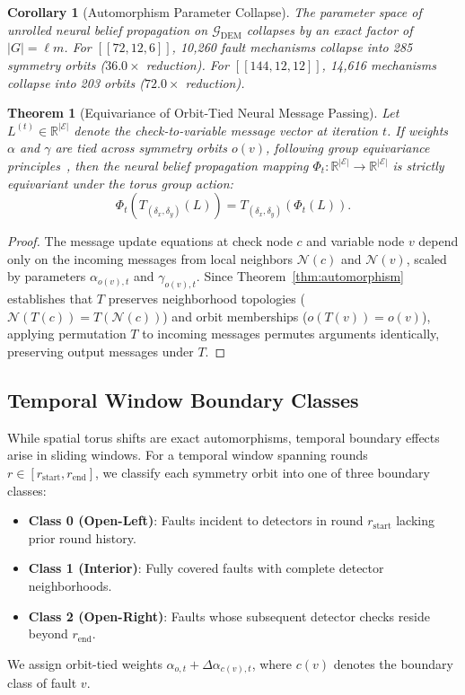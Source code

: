 \documentclass[journal]{IEEEtran}
\newtheorem{theorem}{Theorem}
\newtheorem{corollary}{Corollary}
\begin{document}
\begin{corollary}[Automorphism Parameter Collapse]
The parameter space of unrolled neural belief propagation on $\mathcal{G}_{\text{DEM}}$ collapses by an exact factor of $|G| = \ell m$. For $[[72,12,6]]$, 10,260 fault mechanisms collapse into 285 symmetry orbits ($36.0\times$ reduction). For $[[144,12,12]]$, 14,616 mechanisms collapse into 203 orbits ($72.0\times$ reduction).
\end{corollary}

\begin{theorem}[Equivariance of Orbit-Tied Neural Message Passing]
Let $L^{(t)} \in \mathbb{R}^{|\mathcal{E}|}$ denote the check-to-variable message vector at iteration $t$. If weights $\alpha$ and $\gamma$ are tied across symmetry orbits $o(v)$, following group equivariance principles~\cite{wang2022approximately}, then the neural belief propagation mapping $\Phi_t: \mathbb{R}^{|\mathcal{E}|} \to \mathbb{R}^{|\mathcal{E}|}$ is strictly equivariant under the torus group action:
\begin{equation}
    \Phi_t(T_{(\delta_x, \delta_y)}(L)) = T_{(\delta_x, \delta_y)}(\Phi_t(L)).
\end{equation}
\end{theorem}

\begin{proof}
The message update equations at check node $c$ and variable node $v$ depend only on the incoming messages from local neighbors $\mathcal{N}(c)$ and $\mathcal{N}(v)$, scaled by parameters $\alpha_{o(v), t}$ and $\gamma_{o(v), t}$. Since Theorem~\ref{thm:automorphism} establishes that $T$ preserves neighborhood topologies ($\mathcal{N}(T(c)) = T(\mathcal{N}(c))$) and orbit memberships ($o(T(v)) = o(v)$), applying permutation $T$ to incoming messages permutes arguments identically, preserving output messages under $T$.
\end{proof}

\subsection{Temporal Window Boundary Classes}
While spatial torus shifts are exact automorphisms, temporal boundary effects arise in sliding windows. For a temporal window spanning rounds $r \in [r_{\text{start}}, r_{\text{end}}]$, we classify each symmetry orbit into one of three boundary classes:
\begin{itemize}
    \item \textbf{Class 0 (Open-Left)}: Faults incident to detectors in round $r_{\text{start}}$ lacking prior round history.
    \item \textbf{Class 1 (Interior)}: Fully covered faults with complete detector neighborhoods.
    \item \textbf{Class 2 (Open-Right)}: Faults whose subsequent detector checks reside beyond $r_{\text{end}}$.
\end{itemize}
We assign orbit-tied weights $\alpha_{o, t} + \Delta\alpha_{c(v), t}$, where $c(v)$ denotes the boundary class of fault $v$.
\end{document}
